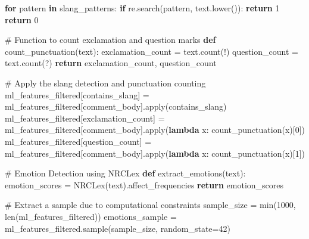 \documentclass[
  12pt,
  letterpaper,
  DIV=11,
  numbers=noendperiod]{scrartcl}
\newenvironment{Shaded}{\begin{snugshade}}{\end{snugshade}}
\newcommand{\BuiltInTok}[1]{\textcolor[rgb]{0.00,0.23,0.31}{#1}}
\newcommand{\CommentTok}[1]{\textcolor[rgb]{0.37,0.37,0.37}{#1}}
\newcommand{\ControlFlowTok}[1]{\textcolor[rgb]{0.00,0.23,0.31}{\textbf{#1}}}
\newcommand{\DecValTok}[1]{\textcolor[rgb]{0.68,0.00,0.00}{#1}}
\newcommand{\KeywordTok}[1]{\textcolor[rgb]{0.00,0.23,0.31}{\textbf{#1}}}
\newcommand{\NormalTok}[1]{\textcolor[rgb]{0.00,0.23,0.31}{#1}}
\newcommand{\OperatorTok}[1]{\textcolor[rgb]{0.37,0.37,0.37}{#1}}
\newcommand{\StringTok}[1]{\textcolor[rgb]{0.13,0.47,0.30}{#1}}
\begin{document}
\begin{Shaded}
\begin{Highlighting}[]
    \ControlFlowTok{for}\NormalTok{ pattern }\KeywordTok{in}\NormalTok{ slang\_patterns:}
        \ControlFlowTok{if}\NormalTok{ re.search(pattern, text.lower()):}
            \ControlFlowTok{return} \DecValTok{1}
    \ControlFlowTok{return} \DecValTok{0}

\CommentTok{\# Function to count exclamation and question marks}
\KeywordTok{def}\NormalTok{ count\_punctuation(text):}
\NormalTok{    exclamation\_count }\OperatorTok{=}\NormalTok{ text.count(}\StringTok{\textquotesingle{}!\textquotesingle{}}\NormalTok{)}
\NormalTok{    question\_count }\OperatorTok{=}\NormalTok{ text.count(}\StringTok{\textquotesingle{}?\textquotesingle{}}\NormalTok{)}
    \ControlFlowTok{return}\NormalTok{ exclamation\_count, question\_count}

\CommentTok{\# Apply the slang detection and punctuation counting}
\NormalTok{ml\_features\_filtered[}\StringTok{\textquotesingle{}contains\_slang\textquotesingle{}}\NormalTok{] }\OperatorTok{=}\NormalTok{ ml\_features\_filtered[}\StringTok{\textquotesingle{}comment\_body\textquotesingle{}}\NormalTok{].}\BuiltInTok{apply}\NormalTok{(contains\_slang)}
\NormalTok{ml\_features\_filtered[}\StringTok{\textquotesingle{}exclamation\_count\textquotesingle{}}\NormalTok{] }\OperatorTok{=}\NormalTok{ ml\_features\_filtered[}\StringTok{\textquotesingle{}comment\_body\textquotesingle{}}\NormalTok{].}\BuiltInTok{apply}\NormalTok{(}\KeywordTok{lambda}\NormalTok{ x: count\_punctuation(x)[}\DecValTok{0}\NormalTok{])}
\NormalTok{ml\_features\_filtered[}\StringTok{\textquotesingle{}question\_count\textquotesingle{}}\NormalTok{] }\OperatorTok{=}\NormalTok{ ml\_features\_filtered[}\StringTok{\textquotesingle{}comment\_body\textquotesingle{}}\NormalTok{].}\BuiltInTok{apply}\NormalTok{(}\KeywordTok{lambda}\NormalTok{ x: count\_punctuation(x)[}\DecValTok{1}\NormalTok{])}

\CommentTok{\# Emotion Detection using NRCLex}
\KeywordTok{def}\NormalTok{ extract\_emotions(text):}
\NormalTok{    emotion\_scores }\OperatorTok{=}\NormalTok{ NRCLex(text).affect\_frequencies}
    \ControlFlowTok{return}\NormalTok{ emotion\_scores}

\CommentTok{\# Extract a sample due to computational constraints}
\NormalTok{sample\_size }\OperatorTok{=} \BuiltInTok{min}\NormalTok{(}\DecValTok{1000}\NormalTok{, }\BuiltInTok{len}\NormalTok{(ml\_features\_filtered))}
\NormalTok{emotions\_sample }\OperatorTok{=}\NormalTok{ ml\_features\_filtered.sample(sample\_size, random\_state}\OperatorTok{=}\DecValTok{42}\NormalTok{)}


\end{Highlighting}
\end{Shaded}
\end{document}
